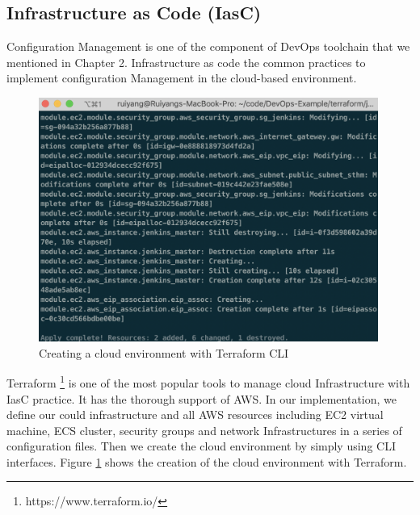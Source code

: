 \subsection{Infrastructure as Code (IasC)}
Configuration Management is one of the component of DevOps toolchain that we mentioned in Chapter 2. Infrastructure as code the common practices to implement configuration Management in the cloud-based environment.
\begin{figure}[h]
\centering
\includegraphics[width=0.99\textwidth]{pics/terraform.png}
\caption{Creating a cloud environment with Terraform CLI}
\label{fig:terraform}
\end{figure}
\par
Terraform \footnote{https://www.terraform.io/} is one of the most popular tools to manage cloud Infrastructure with IasC practice. It has the thorough support of AWS. In our implementation, we define our could infrastructure and all AWS resources including EC2 virtual machine, ECS cluster, security groups and network Infrastructures in a series of configuration files. Then we create the cloud environment by simply using CLI interfaces. Figure \ref{fig:terraform} shows the creation of the cloud environment with Terraform.
